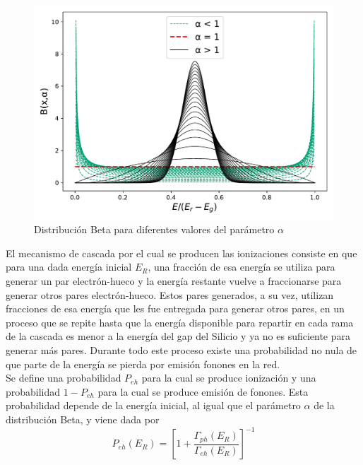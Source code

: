 \begin{figure}%
    \centering
    \includegraphics[scale=.7]{Figs/BetaDistFig.pdf}
    \caption{\footnotesize{Distribución Beta para diferentes valores del parámetro $\alpha$}}
    \label{fig:BetaDist}
\end{figure}
El mecanismo de cascada por el cual se producen las ionizaciones consiste en que para una dada energía inicial $E_{R}$, una fracción de esa energía se utiliza para generar un par electrón-hueco y la energía restante vuelve a fraccionarse para generar otros pares electrón-hueco. Estos pares generados, a su vez, utilizan fracciones de esa energía que les fue entregada para generar otros pares, en un proceso que se repite hasta que la energía disponible para repartir en cada rama de la cascada es menor a la energía del gap del Silicio y ya no es suficiente para generar más pares. Durante todo este proceso existe una probabilidad no nula de que parte de la energía se pierda por emisión fonones en la red.\\
\indent Se define una probabilidad $P_{eh}$ para la cual se produce ionización y una probabilidad $1 - P_{eh}$ para la cual se produce emisión de fonones. Esta probabilidad depende de la energía inicial, al igual que el parámetro $\alpha$ de la distribución Beta, y viene dada por
\begin{equation}
    P_{eh}(E_{R}) = 
    \left[
        1 + \frac{\Gamma_{ph}(E_{R})}{\Gamma_{eh}(E_{R})}
    \right]^{-1}
        \label{ec:ProbabilidadIonizacion}
\end{equation}

